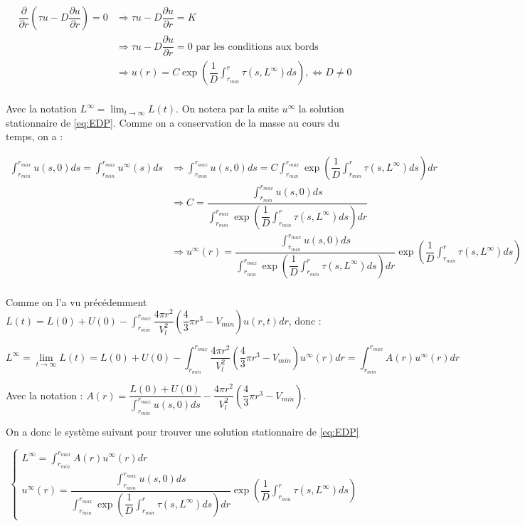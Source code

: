 \documentclass[a4paper,fleqn,leqno]{article}
\newcommand{\bint}{\displaystyle\int}
\begin{document}
\begin{align*}
\dfrac{\partial}{\partial r} (\tau u - D \dfrac{\partial u}{\partial r}) = 0 & \Rightarrow \tau u - D \dfrac{\partial u}{\partial r} = K\\
& \Rightarrow \tau u - D \dfrac{\partial u}{\partial r} = 0 \text{ par les conditions aux bords}\\
& \Rightarrow u(r) = C \exp(\dfrac{1}{D} \int^r_{r_{min}} \tau(s,L^{\infty}) ds), \iff D \neq 0\\
\end{align*}

Avec la notation $L^{\infty} = \lim_{t \rightarrow \infty} L(t)$. On notera par la suite $u^{\infty}$ la solution stationnaire de \eqref{eq:EDP}. Comme on a conservation de la masse au cours du temps, on a :

\begin{align*}
\bint^{r_{max}}_{r_{min}} u(s,0) ds = \bint^{r_{max}}_{r_{min}} u^{\infty}(s) ds & \Rightarrow \bint^{r_{max}}_{r_{min}} u(s,0) ds = C \bint^{r_{max}}_{r_{min}}\exp(\dfrac{1}{D} \bint^r_{r_{min}} \tau(s,L^{\infty}) ds) dr \\
& \Rightarrow C = \dfrac{\bint^{r_{max}}_{r_{min}} u(s,0) ds}{\bint^{r_{max}}_{r_{min}}\exp(\dfrac{1}{D} \bint^r_{r_{min}} \tau(s,L^{\infty}) ds) dr}\\
& \Rightarrow u^{\infty}(r) = \dfrac{\bint^{r_{max}}_{r_{min}} u(s,0) ds }{\bint^{r_{max}}_{r_{min}}\exp(\dfrac{1}{D} \bint^r_{r_{min}} \tau(s,L^{\infty}) ds) dr}\exp(\dfrac{1}{D} \bint^r_{r_{min}} \tau(s,L^{\infty}) ds)\\
\end{align*}

Comme on l'a vu précédemment $L(t) = L(0) + U(0) - \bint^{r_{max}}_{r_{min}}\dfrac{4\pi r^2}{V^2_l} (\dfrac{4}{3}\pi r^3 - V_{min}) u(r,t) dr$, donc :

$$ L ^{\infty} = \lim_{t \rightarrow \infty} L(t) = L(0) + U(0) - \bint^{r_{max}}_{r_{min}}\dfrac{4\pi r^2}{V^2_l} (\dfrac{4}{3}\pi r^3 - V_{min}) u^{\infty}(r)dr = \bint^{r_{max}}_{r_{min}} A(r)u^{\infty}(r)dr$$

Avec la notation : $A(r) = \dfrac{L(0) + U(0)}{\bint^{r_{max}}_{r_{min}} u(s,0) ds} - \dfrac{4\pi r^2}{V^2_l} (\dfrac{4}{3}\pi r^3 - V_{min})$.

On a donc le système suivant pour trouver une solution stationnaire de \eqref{eq:EDP}

\begin{equation*}\label{eq:Pf}\tag{$P_f$}
\begin{cases}
L^{\infty} = \bint^{r_{max}}_{r_{min}} A(r)u^{\infty}(r)dr \\
u^{\infty}(r) = \dfrac{\bint^{r_{max}}_{r_{min}} u(s,0) ds}{\bint^{r_{max}}_{r_{min}}\exp(\dfrac{1}{D} \bint^r_{r_{min}} \tau(s,L^{\infty}) ds) dr}\exp\left(\dfrac{1}{D} \bint^r_{r_{min}} \tau(s,L^{\infty}) ds\right)
\end{cases}
\end{equation*}
\end{document}
